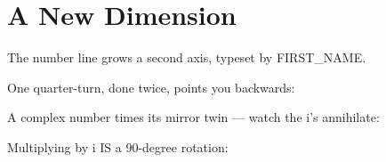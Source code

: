 
\section{A New Dimension}

The number line grows a second axis, typeset by {{FIRST_NAME}}.

One quarter-turn, done twice, points you backwards:



A complex number times its mirror twin — watch the i's annihilate:



Multiplying by i IS a 90-degree rotation:


